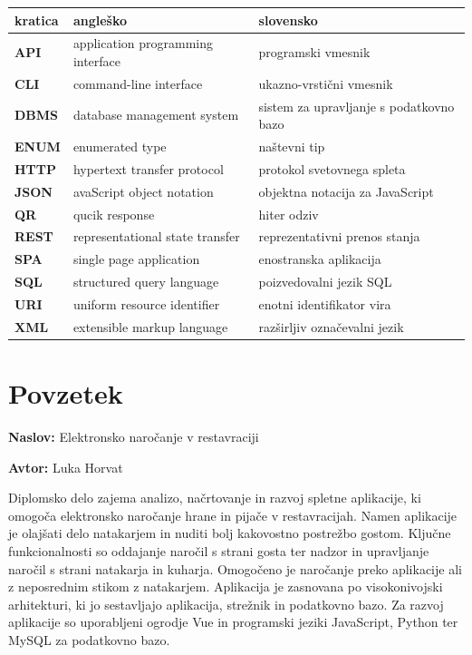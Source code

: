 \documentclass[a4paper, 12pt]{book}
\newcommand{\ttitle}{Elektronsko naročanje v restavraciji}
\newcommand{\tauthor}{Luka Horvat}
\newcommand{\clearemptydoublepage}{\newpage{\pagestyle{empty}\cleardoublepage}}
\begin{document}
\noindent\begin{tabular}{p{}|p{}|p{}}    %
  {\bf kratica} & {\bf angleško}                             & {\bf slovensko} \\ \hline
  {\bf API}   &  application programming interface              & programski vmesnik\\
  {\bf CLI}   & command-line interface              & ukazno-vrstični vmesnik \\
  {\bf DBMS}   &  database management system              & sistem za upravljanje s podatkovno bazo \\
  {\bf ENUM}   & enumerated type              & naštevni tip \\
  {\bf HTTP}   &  hypertext transfer protocol               &  protokol svetovnega spleta \\
  {\bf JSON}   &  avaScript object notation               &  objektna notacija za JavaScript \\
  {\bf QR}   &  qucik  response              & hiter odziv\\
  {\bf REST}   & representational state transfer              & reprezentativni prenos stanja \\
  {\bf SPA}      & single page application               &  enostranska aplikacija \\	
  {\bf SQL} & structured query language & poizvedovalni jezik SQL  \\
  {\bf URI}   &  uniform resource identifier              & enotni identifikator vira \\
  {\bf XML}   &  extensible markup language              & razširljiv označevalni jezik \\

\end{tabular}


\clearemptydoublepage

\chapter*{Povzetek}

\noindent\textbf{Naslov:} \ttitle
\bigskip

\noindent\textbf{Avtor:} \tauthor
\bigskip


\noindent 
Diplomsko delo zajema analizo, načrtovanje in razvoj spletne aplikacije, ki omogoča elektronsko naročanje hrane in pijače v restavracijah. Namen aplikacije je olajšati delo natakarjem in nuditi bolj kakovostno postrežbo gostom. Ključne funkcionalnosti so oddajanje naročil s strani gosta ter nadzor in upravljanje naročil s strani natakarja in kuharja. Omogočeno je naročanje preko aplikacije ali z neposrednim stikom z natakarjem. Aplikacija je zasnovana po visokonivojski arhitekturi, ki jo sestavljajo aplikacija, strežnik in podatkovno bazo. Za razvoj aplikacije so uporabljeni ogrodje Vue in programski jeziki JavaScript, Python ter MySQL za podatkovno bazo.
\bigskip
\end{document}
